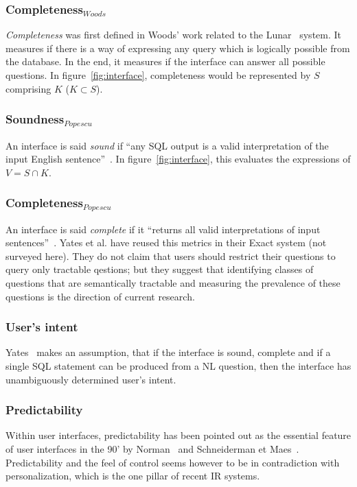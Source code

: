 \documentclass[10pt,journal,letterpaper,compsoc]{IEEEtran}
\begin{document}
\subsubsection{Completeness$_{Woods}$}
{\it Completeness} was first defined in Woods' work related to the {\sc
Lunar}~\cite{Woods:1973:PNL:1499586.1499695} system. 
It measures if there is a way of expressing any query which is logically
possible from the database. In the end, it measures if the interface can answer
all possible questions. In figure~\ref{fig:interface}, completeness would be
represented by $S$ comprising $K$ ($K\subset S$).


\subsubsection{Soundness$_{Popescu}$}
An interface is said {\it sound} if ``any SQL output is a valid interpretation
of the input English sentence''~\cite{Yates:2003:RNL:604045.604075}. In
figure~\ref{fig:interface}, this evaluates the expressions of $V=S\cap K$.


\subsubsection{Completeness$_{Popescu}$}
An interface is said {\it complete} if it ``returns all valid interpretations of
input sentences''~\cite{Yates:2003:RNL:604045.604075}.
Yates et al. have reused this metrics in their {\sc Exact} system (not surveyed
here). They do not claim that users should restrict their questions to query
only tractable qestions; but they suggest that identifying classes of questions
that are semantically tractable and measuring the prevalence of these questions
is the direction of current research.


\subsubsection{User's intent}
Yates~\cite{Yates:2003:RNL:604045.604075} makes an assumption, that if the
interface is sound, complete and if a single SQL statement can be produced from
a NL question, then the interface has unambiguously determined user's intent. 

\subsubsection{Predictability}
Within user interfaces, predictability has been pointed out as the essential
feature of user interfaces in the 90' by
Norman~\cite{Norman:1994:MPI:176789.176796} and Schneiderman et
Maes~\cite{Shneiderman:1997:DMV:267505.267514}. 
Predictability and the feel of control seems however to be in contradiction with
personalization, which is the one pillar of recent IR systems. 
\end{document}
